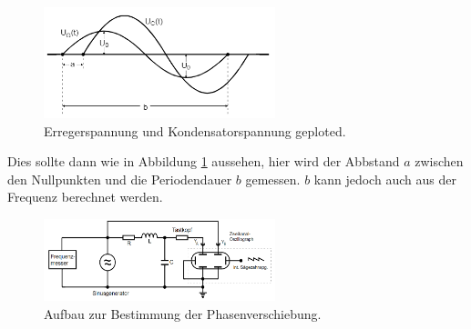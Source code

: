 \begin{figure}[H]
    \centering
    \includegraphics[width=0.6\textwidth]{images/5dplot.PNG}
    \caption{Erregerspannung und Kondensatorspannung geploted\protect \cite{V354}.}
    \label{img:5dplot}
\end{figure}

\noindent Dies sollte dann wie in Abbildung \ref{img:5dplot} aussehen, hier wird der Abbstand $a$ zwischen den Nullpunkten und die Periodendauer $b$ 
gemessen. $b$ kann jedoch auch aus der Frequenz berechnet werden.


\begin{figure}[H]
    \centering
    \includegraphics[width=0.6\textwidth]{images/5d.PNG}
    \caption{Aufbau zur Bestimmung der Phasenverschiebung\protect \cite{V354}.}
    \label{img:5d}
\end{figure}
